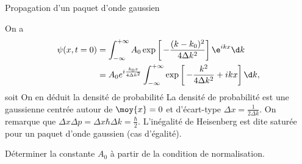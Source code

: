 \begin{exo}[PC][2]{Propagation d’un paquet d'onde gaussien}
\begin{quest}
{  On a
  \begin{align*}
    \psi(x,t = 0) & = \int_{-\infty}^{+\infty} A_0 \exp\left[\, -\frac{(k-k_0)^2}{4\Delta k^2}\right] \e^{ikx}\d k \\ 
    & = A_0 e^{ i\frac{k_0 x}{4 \Delta k^2}} \int_{-\infty}^{+\infty} \exp\left[\, -\frac{k^2}{4\Delta k^2} + ikx\right]\d k,
  \end{align*}
  soit 
  On en déduit la densité de probabilité
  La densité de probabilité est une gaussienne centrée autour de $\moy{x}=0$ et d'écart-type $\Delta x = \frac{1}{2\Delta k}$. On remarque que $\Delta x \Delta p = \Delta x \hbar \Delta k = \frac{\hbar}{2}$. L'inégalité de Heisenberg est dite saturée pour un paquet d'onde gaussien (cas d'égalité).
  
  
  }


\item Déterminer la constante $A_0$ à partir de la condition de normalisation. 


\end{quest}
\end{exo}
